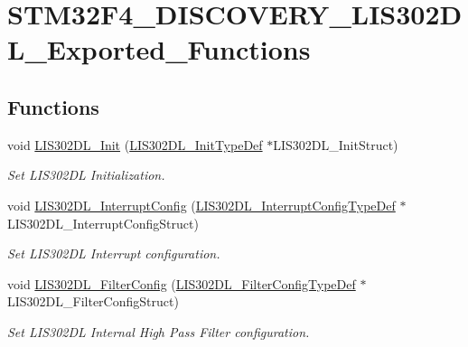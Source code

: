 \hypertarget{group___s_t_m32_f4___d_i_s_c_o_v_e_r_y___l_i_s302_d_l___exported___functions}{\section{S\-T\-M32\-F4\-\_\-\-D\-I\-S\-C\-O\-V\-E\-R\-Y\-\_\-\-L\-I\-S302\-D\-L\-\_\-\-Exported\-\_\-\-Functions}
\label{group___s_t_m32_f4___d_i_s_c_o_v_e_r_y___l_i_s302_d_l___exported___functions}
}
\subsection*{Functions}
\begin{DoxyCompactItemize}
\item 
void \hyperlink{group___s_t_m32_f4___d_i_s_c_o_v_e_r_y___l_i_s302_d_l___exported___functions_ga0ceeaa64f528427ffca42afd45051df6}{L\-I\-S302\-D\-L\-\_\-\-Init} (\hyperlink{struct_l_i_s302_d_l___init_type_def}{L\-I\-S302\-D\-L\-\_\-\-Init\-Type\-Def} $\ast$L\-I\-S302\-D\-L\-\_\-\-Init\-Struct)
\begin{DoxyCompactList}\small\item\em Set L\-I\-S302\-D\-L Initialization. \end{DoxyCompactList}\item 
void \hyperlink{group___s_t_m32_f4___d_i_s_c_o_v_e_r_y___l_i_s302_d_l___exported___functions_ga8b1f05ec087784131846221e7992e1b4}{L\-I\-S302\-D\-L\-\_\-\-Interrupt\-Config} (\hyperlink{struct_l_i_s302_d_l___interrupt_config_type_def}{L\-I\-S302\-D\-L\-\_\-\-Interrupt\-Config\-Type\-Def} $\ast$L\-I\-S302\-D\-L\-\_\-\-Interrupt\-Config\-Struct)
\begin{DoxyCompactList}\small\item\em Set L\-I\-S302\-D\-L Interrupt configuration. \end{DoxyCompactList}\item 
void \hyperlink{group___s_t_m32_f4___d_i_s_c_o_v_e_r_y___l_i_s302_d_l___exported___functions_ga0c2ce8efd66b092a82e64f88ed5b9e9a}{L\-I\-S302\-D\-L\-\_\-\-Filter\-Config} (\hyperlink{struct_l_i_s302_d_l___filter_config_type_def}{L\-I\-S302\-D\-L\-\_\-\-Filter\-Config\-Type\-Def} $\ast$L\-I\-S302\-D\-L\-\_\-\-Filter\-Config\-Struct)
\begin{DoxyCompactList}\small\item\em Set L\-I\-S302\-D\-L Internal High Pass Filter configuration. \end{DoxyCompactList}\item 

\end{DoxyCompactItemize}
